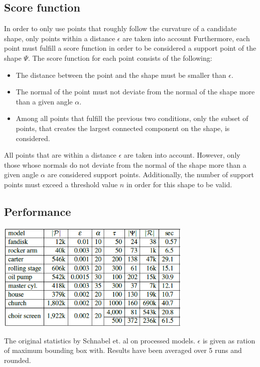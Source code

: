 \subsection{Score function}
\label{sec:scorefun}
In order to only use points that roughly follow the curvature of a candidate shape, only points within a distance $\epsilon$ are taken into account Furthermore, each point must fulfill a score function in order to be considered a support point of the shape $\Psi$. 
The score function for each point consists of the following: 
\begin{itemize}
	\item The distance between the point and the shape must be smaller than $\epsilon$.
	\item The normal of the point must not deviate from the normal of the shape more than a given angle $\alpha$.
	\item Among all points that fulfill the previous two conditions, only the subset of points, that creates the largest connected component on the shape,  is considered.
\end{itemize}

All points that are within a distance $\epsilon$ are taken into account. However, only those whose normals do not deviate from the normal of the shape more than a given angle $\alpha$ are considered support points. Additionally, the number of support points must exceed a threshold value $n$ in order for this shape to be valid. 


\subsection{Performance}
\begin{table}
	\centering
	\includegraphics[width=0.7\textwidth]{Shape_Detection/schnabel-performance.png}
	\caption{The original statistics by Schnabel et. al\cite{schnabel-2007-efficient} on processed models. $\epsilon$ is given as ration of maximum bounding box with. Results have been averaged over 5 runs and rounded.}
	\label{table:schnabel_performance}
\end{table}

